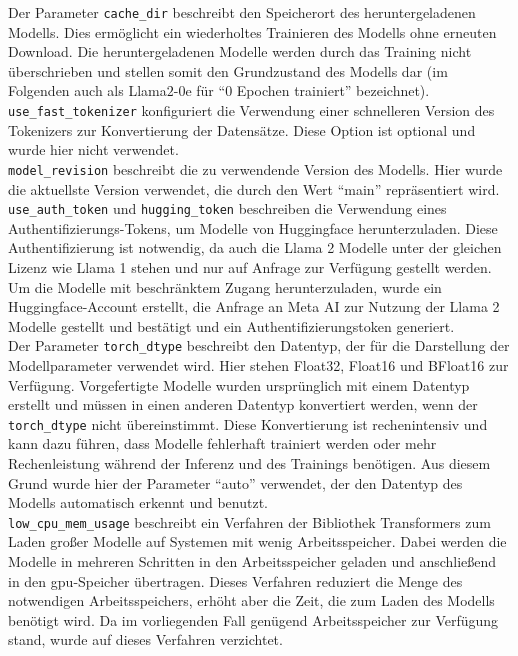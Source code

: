 Der Parameter \texttt{cache\_dir} beschreibt den Speicherort des heruntergeladenen Modells.
Dies ermöglicht ein wiederholtes Trainieren des Modells ohne erneuten Download.
Die heruntergeladenen Modelle werden durch das Training nicht überschrieben und stellen somit den Grundzustand des Modells dar (im Folgenden auch als Llama$2$-$0$e für \enquote{$0$ Epochen trainiert} bezeichnet).\\

\texttt{use\_fast\_tokenizer} konfiguriert die Verwendung einer schnelleren Version des Tokenizers zur Konvertierung der Datensätze.
Diese Option ist optional und wurde hier nicht verwendet.\\

\texttt{model\_revision} beschreibt die zu verwendende Version des Modells.
Hier wurde die aktuellste Version verwendet, die durch den Wert \enquote{main} repräsentiert wird.\\
\texttt{use\_auth\_token} und \texttt{hugging\_token} beschreiben die Verwendung eines Authentifizierungs-Tokens, um Modelle von Huggingface herunterzuladen.
Diese Authentifizierung ist notwendig, da auch die Llama 2 Modelle unter der gleichen Lizenz wie Llama 1 stehen und nur auf Anfrage zur Verfügung gestellt werden.
Um die Modelle mit beschränktem Zugang herunterzuladen, wurde ein Huggingface-Account erstellt, die Anfrage an Meta AI zur Nutzung der Llama 2 Modelle gestellt und bestätigt und ein Authentifizierungstoken generiert.\\

Der Parameter \texttt{torch\_dtype} beschreibt den Datentyp, der für die Darstellung der Modellparameter verwendet wird.
Hier stehen Float32, Float16 und BFloat16 zur Verfügung.
Vorgefertigte Modelle wurden ursprünglich mit einem Datentyp erstellt und müssen in einen anderen Datentyp konvertiert werden, wenn der \texttt{torch\_dtype} nicht übereinstimmt.
Diese Konvertierung ist rechenintensiv und kann dazu führen, dass Modelle fehlerhaft trainiert werden oder mehr Rechenleistung während der Inferenz und des Trainings benötigen.
Aus diesem Grund wurde hier der Parameter \enquote{auto} verwendet, der den Datentyp des Modells automatisch erkennt und benutzt.\\

\texttt{low\_cpu\_mem\_usage} beschreibt ein Verfahren der Bibliothek Transformers zum Laden großer Modelle auf Systemen mit wenig Arbeitsspeicher.
Dabei werden die Modelle in mehreren Schritten in den Arbeitsspeicher geladen und anschließend in den \ac{gpu}-Speicher übertragen.
Dieses Verfahren reduziert die Menge des notwendigen Arbeitsspeichers, erhöht aber die Zeit, die zum Laden des Modells benötigt wird.
Da im vorliegenden Fall genügend Arbeitsspeicher zur Verfügung stand, wurde auf dieses Verfahren verzichtet.

